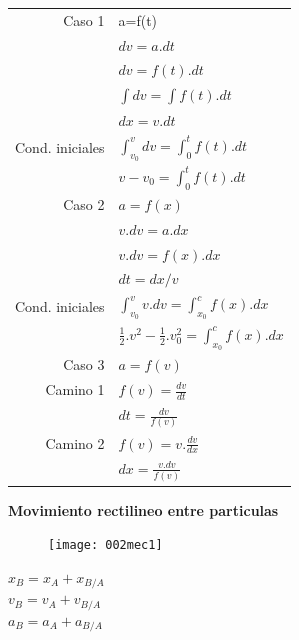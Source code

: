 \documentclass[11pt,a4paper,twocolumn]{article}
\begin{document}
	\begin{tabular}{r | l} 
		Caso 1& a=f(t) \\ 
		& $dv=a.dt$\\ 
		&$dv=f(t).dt$ \\ 
		& $\int dv=\int f(t).dt$\\ \vspace{.2cm}
		& $dx=v.dt$\\ 
		Cond. iniciales&$\int_{v_{0}}^{v}dv=\int_{0}^{t} f(t).dt$ \\ \vspace{.4cm}
		&$v-v_{0}= \int_{0}^{t} f(t).dt$\\ 
		Caso 2& $a=f(x)$\\ 
		&$v.dv=a.dx$ \\ 
		&$ v.dv=f(x).dx$\\ \vspace{.2cm}
		&$dt=dx/v$\\
		Cond. iniciales& $\int_{v_{0}}^{v}v.dv=\int_{x_{0}}^{c}f(x).dx$\\ \vspace{.4cm}
		& $\frac{1}{2}.v^{2}-\frac{1}{2}.v_{0}^{2}=\int_{x_{0}}^{c}f(x).dx$\\\vspace{.2cm}
		Caso 3& $a=f(v)$\\
		Camino 1& $f(v)=\frac{dv}{dt}$\\
		\vspace{.2cm}
		& $dt=\frac{dv}{f(v)}$\\
		Camino 2&$f(v)=v.\frac{dv}{dx} $\\		\vspace{.4cm}
		&$dx=\frac{v.dv}{f(v)}$\\
		
	\end{tabular}


	\textbf{ Movimiento rectilineo entre particulas}

	\begin{figure}[ht]
		\centering
		\texttt{[image: 002mec1]}
	\end{figure}
	\vspace{-0.4 cm}
	\begin{center}
		$x_{B}=x_{A}+x_{B/A} $\\
		$v_{B}=v_{A}+v_{B/A} $\\
		$a_{B}=a_{A}+a_{B/A} $\\
	\end{center}
\end{document}
